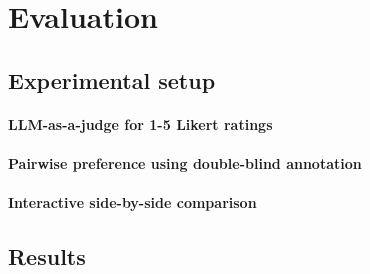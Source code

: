 \section{Evaluation} \label{sec:evaluation}
\subsection{Experimental setup}

\paragraph{LLM-as-a-judge for 1-5 Likert ratings}

\paragraph{Pairwise preference using double-blind annotation}

\paragraph{Interactive side-by-side comparison}

\subsection{Results}

